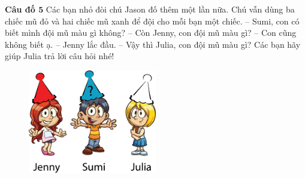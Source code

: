 	\textbf{\color{toancuabi}Câu đố $\pmb5$}
	\vskip 0.1cm
	Các bạn nhỏ đòi chú Jason đố thêm một lần nữa. Chú vẫn dùng ba chiếc mũ đỏ và hai chiếc mũ xanh để đội cho mỗi bạn một chiếc.
	\vskip 0.1cm
	-- Sumi, con có biết mình đội mũ màu gì không?
	\vskip 0.1cm
	-- Còn Jenny, con đội mũ màu gì?
	\vskip 0.1cm
	-- Con cũng không biết ạ. -- Jenny lắc đầu.
	\vskip 0.1cm
	-- Vậy thì Julia, con đội mũ màu gì?
	\vskip 0.1cm
	Các bạn hãy giúp Julia trả lời câu hỏi nhé!
	\begin{figure}[H]
		\centering
		\vspace*{-5pt}
		\captionsetup{labelformat= empty, justification=centering}
		\includegraphics[width=0.5\textwidth]{h4}
		\vspace*{-10pt}
	\end{figure}
